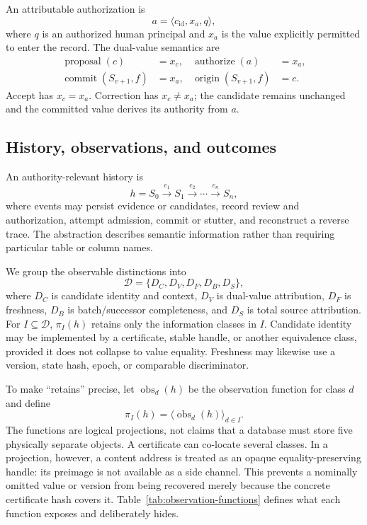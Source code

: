 An attributable authorization is
\begin{equation}
a=\langle c_{\mathrm{id}},x_a,q\rangle,
\label{eq:authorization}
\end{equation}
where $q$ is an authorized human principal and $x_a$ is the value explicitly permitted to enter the record. The dual-value semantics are
\begin{align}
\operatorname{proposal}(c)&=x_c, &
\operatorname{authorize}(a)&=x_a,\nonumber\\
\operatorname{commit}(S_{v+1},f)&=x_a, &
\operatorname{origin}(S_{v+1},f)&=c.
\label{eq:dual-value}
\end{align}
Accept has $x_c=x_a$. Correction has $x_c\neq x_a$; the candidate remains unchanged and the committed value derives its authority from $a$.

\subsection{History, observations, and outcomes}

An authority-relevant history is
\begin{equation}
h=S_0\xrightarrow{e_1}S_1\xrightarrow{e_2}\cdots\xrightarrow{e_n}S_n,
\end{equation}
where events may persist evidence or candidates, record review and authorization, attempt admission, commit or stutter, and reconstruct a reverse trace. The abstraction describes semantic information rather than requiring particular table or column names.

We group the observable distinctions into
\begin{equation}
\mathcal D=\{D_C,D_V,D_F,D_B,D_S\},
\label{eq:distinction-basis}
\end{equation}
where $D_C$ is candidate identity and context, $D_V$ is dual-value attribution, $D_F$ is freshness, $D_B$ is batch/successor completeness, and $D_S$ is total source attribution. For $I\subseteq\mathcal D$, $\pi_I(h)$ retains only the information classes in $I$. Candidate identity may be implemented by a certificate, stable handle, or another equivalence class, provided it does not collapse to value equality. Freshness may likewise use a version, state hash, epoch, or comparable discriminator.

To make ``retains'' precise, let $\operatorname{obs}_d(h)$ be the observation function for class $d$ and define
\begin{equation}
\pi_I(h)=\langle\operatorname{obs}_d(h)\rangle_{d\in I}.
\label{eq:observation-projection}
\end{equation}
The functions are logical projections, not claims that a database must store five physically separate objects. A certificate can co-locate several classes. In a projection, however, a content address is treated as an opaque equality-preserving handle: its preimage is not available as a side channel. This prevents a nominally omitted value or version from being recovered merely because the concrete certificate hash covers it. Table~\ref{tab:observation-functions} defines what each function exposes and deliberately hides.

